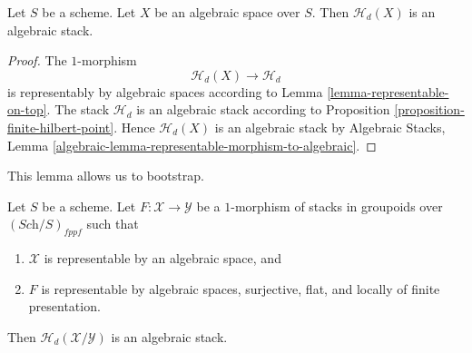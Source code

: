 \begin{lemma}
\label{lemma-hilbert-stack-of-space}
Let $S$ be a scheme.
Let $X$ be an algebraic space over $S$.
Then $\mathcal{H}_d(X)$ is an algebraic stack.
\end{lemma}

\begin{proof}
The $1$-morphism
$$
\mathcal{H}_d(X) \longrightarrow \mathcal{H}_d
$$
is representably by algebraic spaces according to
Lemma \ref{lemma-representable-on-top}.
The stack $\mathcal{H}_d$ is an algebraic stack according to
Proposition \ref{proposition-finite-hilbert-point}.
Hence $\mathcal{H}_d(X)$ is an algebraic stack by
Algebraic Stacks,
Lemma \ref{algebraic-lemma-representable-morphism-to-algebraic}.
\end{proof}

\noindent
This lemma allows us to bootstrap.

\begin{lemma}
\label{lemma-hilbert-stack-relative-space}
Let $S$ be a scheme. Let $F : \mathcal{X} \to \mathcal{Y}$ be a $1$-morphism
of stacks in groupoids over $(\textit{Sch}/S)_{fppf}$ such that
\begin{enumerate}
\item $\mathcal{X}$ is representable by an algebraic space, and
\item $F$ is representable by algebraic spaces, surjective, flat, and
locally of finite presentation.
\end{enumerate}
Then $\mathcal{H}_d(\mathcal{X}/\mathcal{Y})$ is an algebraic stack.
\end{lemma}

